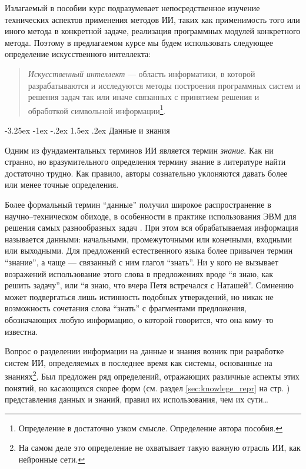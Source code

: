 \documentclass[12pt, openany, twoside]{book} %
\makeatletter
\renewcommand\section{\@startsection {section}{1}{\z@}%
                                   {-3.25ex \@plus -1ex \@minus -.2ex}%
                                   {1.5ex \@plus.2ex}%
                                   {\normalfont\large\bfseries}}
\makeatother
\begin{document}
Излагаемый в пособии курс подразумевает непосредственное изучение технических аспектов применения методов ИИ, таких как применимость того или иного метода в конкретной задаче, реализация программных модулей конкретного метода. Поэтому в предлагаемом курсе мы будем использовать следующее определение искусственного интеллекта:
\begin{quote}{\em
Искусственный интеллект} --- область информатики, в которой разрабатываются и исследуются методы построения программных систем и решения задач так или иначе связанных с принятием решения и обработкой символьной информации\footnote{Определение в достаточно узком смысле. Определение автора пособия.}.
\end{quote}

\section{Данные и знания}

Одним из фундаментальных терминов ИИ является термин {\em знание}. Как ни странно, но вразумительного определения термину знание в литературе най\-ти достаточно трудно. Как правило, авторы сознательно уклоняются давать более или менее точные определения.

Более формальный термин ``данные'' получил широкое распространение в научно--техническом обиходе, в особенности в практике использования ЭВМ для решения самых разнообразных задач \cite{AIDictionary}. При этом вся обрабатываемая информация называется данными: началь\-ны\-ми, промежуточными или конечными, входными или выходными. Для предложений естественного языка более привычен термин ``знание'', а чаще --- связанный с ним глагол ``знать''. Ни у кого не вызывает возражений использование этого слова в предложениях вроде ``я знаю, как решить задачу'', или ``я знаю, что вчера Петя встречался с Наташей''. Сомнению может подвергаться лишь истинность подобных утверждений, но никак не возможность сочетания слова ``знать'' с фрагментами предложения, обозначающих любую информацию, о которой говорится, что она кому--то известна.

Вопрос о разделении информации на данные и знания возник при разработке систем ИИ, определяемых в последнее время как системы, основанные на знаниях\footnote{На самом деле это определение не охватывает такую важную отрасль ИИ, как нейронные сети.}. Был предложен ряд определений, отражающих различные аспекты этих понятий, но касающихся скорее форм (см. раздел \ref{sec:knowlege_repr} на стр. \pageref{sec:knowlege_repr}) представления данных и знаний, правил их использования, чем их сути\ldots
\end{document}
